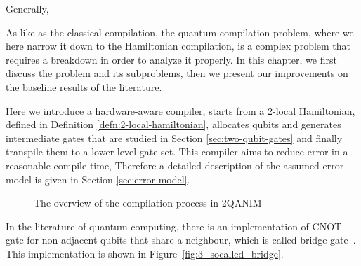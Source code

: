 \documentclass{report}
\begin{document}
Generally, 

As like as the classical compilation, the quantum compilation problem, where we here narrow it down to the Hamiltonian compilation, is a complex problem that requires a breakdown in order to analyze it properly. In this chapter, we first discuss the problem and its subproblems, then we present our improvements on the baseline results of the literature.



Here we introduce a hardware-aware compiler, starts from a 2-local Hamiltonian, defined in Definition \ref{defn:2-local-hamiltonian}, allocates qubits and generates intermediate gates that are studied in Section \ref{sec:two-qubit-gates} and finally transpile them to a lower-level gate-set. This compiler aims to reduce error in a reasonable compile-time, Therefore a detailed description of the assumed error model is given in Section \ref{sec:error-model}.

\begin{figure}[h]
  \centering
{}
\caption{The overview of the compilation process in 2QANIM}
\end{figure}


In the literature of quantum computing, there is an implementation of $\mathrm{CNOT}$ gate for non-adjacent qubits that share a neighbour, which is called bridge gate~\cite{shende2006,itoko2019}. This implementation is shown in Figure~\ref{fig:3_socalled_bridge}.
\end{document}

